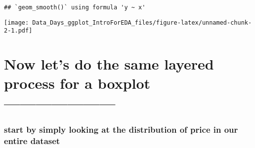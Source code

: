 \documentclass[
]{article}
\newenvironment{Shaded}{\begin{snugshade}}{\end{snugshade}}
\newcommand{\DataTypeTok}[1]{\textcolor[rgb]{0.13,0.29,0.53}{#1}}
\newcommand{\FloatTok}[1]{\textcolor[rgb]{0.00,0.00,0.81}{#1}}
\newcommand{\KeywordTok}[1]{\textcolor[rgb]{0.13,0.29,0.53}{\textbf{#1}}}
\newcommand{\NormalTok}[1]{#1}
\newcommand{\OperatorTok}[1]{\textcolor[rgb]{0.81,0.36,0.00}{\textbf{#1}}}
\newcommand{\StringTok}[1]{\textcolor[rgb]{0.31,0.60,0.02}{#1}}
\begin{document}
\begin{Shaded}
\end{Shaded}

\begin{verbatim}
## `geom_smooth()` using formula 'y ~ x'
\end{verbatim}

\texttt{[image: Data\_Days\_ggplot\_IntroForEDA\_files/figure-latex/unnamed-chunk-2-1.pdf]}

\hypertarget{now-lets-do-the-same-layered-process-for-a-boxplot}{%
\section{Now let's do the same layered process for a boxplot
---------------------}\label{now-lets-do-the-same-layered-process-for-a-boxplot}}

\hypertarget{start-by-simply-looking-at-the-distribution-of-price-in-our-entire-dataset}{%
\subsubsection{start by simply looking at the distribution of price in
our entire
dataset}\label{start-by-simply-looking-at-the-distribution-of-price-in-our-entire-dataset}}

\begin{Shaded}
\end{Shaded}
\end{document}
